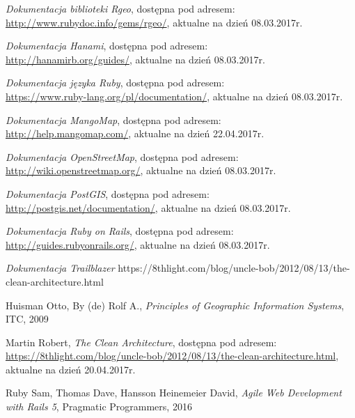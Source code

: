 \documentclass[printmode]{mgr}
\begin{document}
\begin{thebibliography}{inz}

  \emph{Dokumentacja biblioteki Rgeo}, dostępna pod adresem:\\ \url{http://www.rubydoc.info/gems/rgeo/}, aktualne na dzień 08.03.2017r.

  \emph{Dokumentacja Hanami}, dostępna pod adresem:\\ \url{http://hanamirb.org/guides/}, aktualne na dzień 08.03.2017r.

  \emph{Dokumentacja języka Ruby}, dostępna pod adresem:\\ \url{https://www.ruby-lang.org/pl/documentation/}, aktualne na dzień 08.03.2017r.

  \emph{Dokumentacja MangoMap}, dostępna pod adresem:\\ \url{http://help.mangomap.com/}, aktualne na dzień 22.04.2017r.

  \emph{Dokumentacja OpenStreetMap}, dostępna pod adresem:\\ \url{http://wiki.openstreetmap.org/}, aktualne na dzień 08.03.2017r.

  \emph{Dokumentacja PostGIS}, dostępna pod adresem:\\ \url{http://postgis.net/documentation/}, aktualne na dzień 08.03.2017r.

  \emph{Dokumentacja Ruby on Rails}, dostępna pod adresem:\\ \url{http://guides.rubyonrails.org/}, aktualne na dzień 08.03.2017r.

  \emph{Dokumentacja Trailblazer} https://8thlight.com/blog/uncle-bob/2012/08/13/the-clean-architecture.html

  Huisman Otto, By (de) Rolf A., \emph{Principles of Geographic Information Systems}, ITC, 2009

  Martin Robert, \emph{The Clean Architecture}, dostępna pod adresem:\\ \url{https://8thlight.com/blog/uncle-bob/2012/08/13/the-clean-architecture.html}, aktualne na dzień 20.04.2017r.

  Ruby Sam, Thomas Dave, Hansson Heinemeier David, \emph{Agile Web Development with Rails 5}, Pragmatic Programmers, 2016


\end{thebibliography}
\end{document}
